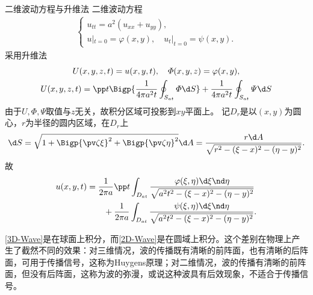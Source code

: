 \begin{example}{二维波动方程与升维法}{}
	二维波动方程
	\begin{align*}
		\begin{cases}
			u_{tt}=a^2(u_{xx}+u_{yy}), \\
			u|_{t=0}=\varphi(x,y),\quad u_t|_{t=0}=\psi(x,y).
		\end{cases}
	\end{align*}
	采用升维法
	\begin{gather*}
		U(x,y,z,t)=u(x,y,t),\quad\varPhi(x,y,z)=\varphi(x,y),\\
		U(x,y,z,t)=\pp t\Bigp{\frac1{4\pi a^2t}\oint_{S_{at}}\varPhi\d S}+\frac1{4\pi a^2t}\oint_{S_{at}}\varPsi\d S
	\end{gather*}
	由于$U,\varPhi,\varPsi$取值与$z$无关，故积分区域可投影到$xy$平面上。
	记$D_r$是以$(x,y)$为圆心，$r$为半径的圆内区域，在$D_r$上
	\[
		\d S=\sqrt{1+\Bigp{\pv\zeta\xi}^2+\Bigp{\pv\zeta\eta}^2}\d A=\frac{r\d A}{\sqrt{r^2-(\xi-x)^2-(\eta-y)^2}}.
	\]
	故
	\begin{align}\label{2D-Wave}
		\begin{aligned}
			u(x,y,t)&= \frac1{2\pi a}\pp t\int_{D_{at}}\frac{\varphi(\xi,\eta)\d\xi\nd\eta}{\sqrt{a^2t^2-(\xi-x)^2-(\eta-y)^2}} \\
			&\qquad +\frac1{2\pi a}\int_{D_{at}}\frac{\psi(\xi,\eta)\d\xi\nd\eta}{\sqrt{a^2t^2-(\xi-x)^2-(\eta-y)^2}}.
		\end{aligned}
	\end{align}
\end{example}
\begin{remark}
	\eqref{3D-Wave}是在球面上积分，而\eqref{2D-Wave}是在圆域上积分。这个差别在物理上产生了截然不同的效果：对三维情况，波的传播既有清晰的前阵面，也有清晰的后阵面，可用于传播信号，这称为Huygens原理；对二维情况，波的传播有清晰的前阵面，但没有后阵面，这称为波的弥漫，或说这种波具有后效现象，不适合于传播信号。
\end{remark}
